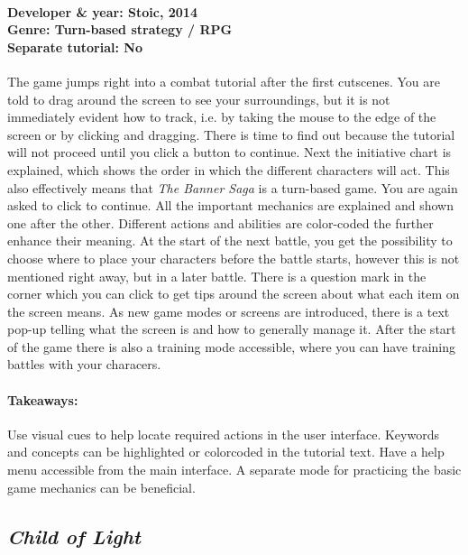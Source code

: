 \paragraph{Developer \& year: Stoic, 2014 \\ Genre: Turn-based strategy / RPG \\ Separate tutorial: No \\}
The game jumps right into a combat tutorial after the first cutscenes. You are told to drag around the screen to see your surroundings, but it is not immediately evident how to track, i.e. by taking the mouse to the edge of the screen or by clicking and dragging. There is time to find out because the tutorial will not proceed until you click a button to continue. Next the initiative chart is explained, which shows the order in which the different characters will act. This also effectively means that \textit{The Banner Saga} is a turn-based game. You are again asked to click to continue. All the important mechanics are explained and shown one after the other. Different actions and abilities are color-coded the further enhance their meaning. At the start of the next battle, you get the possibility to choose where to place your characters before the battle starts, however this is not mentioned right away, but in a later battle. There is a question mark in the corner which you can click to get tips around the screen about what each item on the screen means. As new game modes or screens are introduced, there is a text pop-up telling what the screen is and how to generally manage it. After the start of the game there is also a training mode accessible, where you can have training battles with your characers.
\paragraph{Takeaways:}
Use visual cues to help locate required actions in the user interface. Keywords and concepts can be highlighted or colorcoded in the tutorial text. Have a help menu accessible from the main interface. A separate mode for practicing the basic game mechanics can be beneficial.

\subsection{\textit{Child of Light}}
